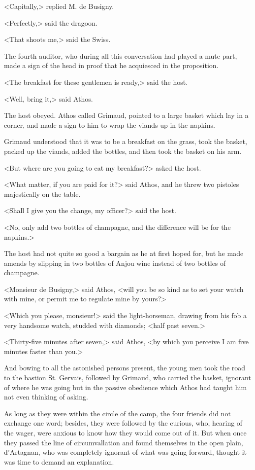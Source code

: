 <Capitally,> replied M. de Busigny. 

<Perfectly,> said the dragoon. 

<That shoots me,> said the Swiss. 

The fourth auditor, who during all this conversation had played a mute part, made a sign of the head in proof that he acquiesced in the proposition. 

<The breakfast for these gentlemen is ready,> said the host. 

<Well, bring it,> said Athos. 

The host obeyed. Athos called Grimaud, pointed to a large basket which lay in a corner, and made a sign to him to wrap the viands up in the napkins. 

Grimaud understood that it was to be a breakfast on the grass, took the basket, packed up the viands, added the bottles, and then took the basket on his arm. 

<But where are you going to eat my breakfast?> asked the host. 

<What matter, if you are paid for it?> said Athos, and he threw two pistoles majestically on the table. 

<Shall I give you the change, my officer?> said the host. 

<No, only add two bottles of champagne, and the difference will be for the napkins.> 

The host had not quite so good a bargain as he at first hoped for, but he made amends by slipping in two bottles of Anjou wine instead of two bottles of champagne. 

<Monsieur de Busigny,> said Athos, <will you be so kind as to set your watch with mine, or permit me to regulate mine by yours?> 

<Which you please, monsieur!> said the light-horseman, drawing from his fob a very handsome watch, studded with diamonds; <half past seven.> 

<Thirty-five minutes after seven,> said Athos, <by which you perceive I am five minutes faster than you.> 

And bowing to all the astonished persons present, the young men took the road to the bastion St. Gervais, followed by Grimaud, who carried the basket, ignorant of where he was going but in the passive obedience which Athos had taught him not even thinking of asking. 

As long as they were within the circle of the camp, the four friends did not exchange one word; besides, they were followed by the curious, who, hearing of the wager, were anxious to know how they would come out of it. But when once they passed the line of circumvallation and found themselves in the open plain, d'Artagnan, who was completely ignorant of what was going forward, thought it was time to demand an explanation. 

